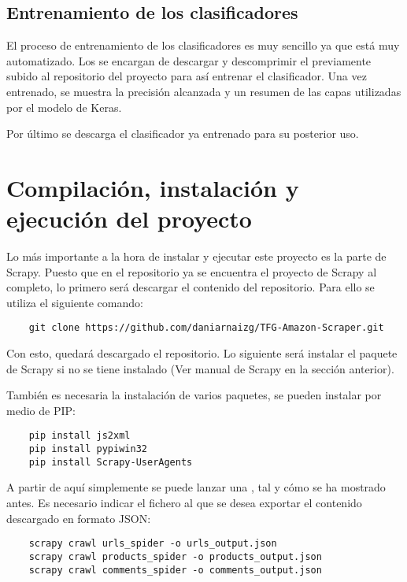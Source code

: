 \subsection{Entrenamiento de los clasificadores}

El proceso de entrenamiento de los clasificadores es muy sencillo ya que está muy automatizado. Los  se encargan de descargar y descomprimir el  previamente subido al repositorio del proyecto para así entrenar el clasificador. Una vez entrenado, se muestra la precisión alcanzada y un resumen de las capas utilizadas por el modelo de Keras.

Por último se descarga el clasificador ya entrenado para su posterior uso.

\section{Compilación, instalación y ejecución del proyecto}

Lo más importante a la hora de instalar y ejecutar este proyecto es la parte de Scrapy. Puesto que en el repositorio ya se encuentra el proyecto de Scrapy al completo, lo primero será descargar el contenido del repositorio. Para ello se utiliza el siguiente comando:

\begin{verbatim}
    git clone https://github.com/daniarnaizg/TFG-Amazon-Scraper.git
\end{verbatim}

Con esto, quedará descargado el repositorio. Lo siguiente será instalar el paquete de Scrapy si no se tiene instalado (Ver manual de Scrapy en la sección anterior).

También es necesaria la instalación de varios paquetes, se pueden instalar por medio de PIP:

\begin{verbatim}
    pip install js2xml
    pip install pypiwin32
    pip install Scrapy-UserAgents
\end{verbatim}

A partir de aquí simplemente se puede lanzar una , tal y cómo se ha mostrado antes. Es necesario indicar el fichero al que se desea exportar el contenido descargado en formato JSON:

\begin{verbatim}
    scrapy crawl urls_spider -o urls_output.json
    scrapy crawl products_spider -o products_output.json
    scrapy crawl comments_spider -o comments_output.json
\end{verbatim}

